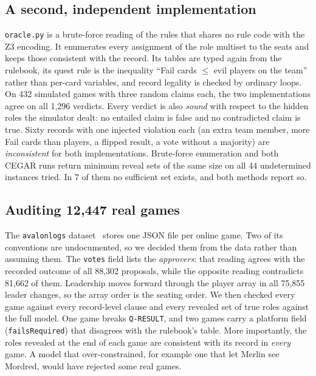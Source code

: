 \documentclass[runningheads]{llncs}
\newcommand{\cl}[1]{\texttt{#1}}
\newcommand{\vd}[1]{\emph{#1}}             %
\begin{document}
\subsection{A second, independent implementation}
\texttt{oracle.py} is a brute-force reading of the rules that shares no rule code with the Z3 encoding. It enumerates
every assignment of the role multiset to the seats and keeps those consistent with the record. Its tables are typed
again from the rulebook, its quest rule is the inequality ``Fail cards $\le$ evil players on the team'' rather than
per-card variables, and record legality is checked by ordinary loops. On 432 simulated games with three random claims
each, the two implementations agree on all 1,296 verdicts. Every verdict is also \emph{sound} with respect to the
hidden roles the simulator dealt: no entailed claim is false and no contradicted claim is true. Sixty records with one
injected violation each (an extra team member, more Fail cards than players, a flipped result, a vote without a
majority) are \vd{inconsistent} for both implementations. Brute-force enumeration and both CEGAR runs return minimum
reveal sets of the same size on all 44 undetermined instances tried. In 7 of them no sufficient set exists, and both
methods report so.

\subsection{Auditing 12,447 real games}\label{sec:audit}
The \texttt{avalonlogs} dataset~\cite{avalonlogs} stores one JSON file per online game. Two of its conventions are
undocumented, so we decided them from the data rather than assuming them. The \texttt{votes} field lists the
\emph{approvers}: that reading agrees with the recorded outcome of all 88,302 proposals, while the opposite reading
contradicts 81,662 of them. Leadership moves forward through the player array in all 75,855 leader changes, so the
array order is the seating order. We then checked every game against every record-level clause and every revealed set
of true roles against the full model. One game breaks \cl{Q-RESULT}, and two games carry a platform field
(\texttt{failsRequired}) that disagrees with the rulebook's table. More importantly, the roles revealed at the end of
each game are consistent with its record in \emph{every} game. A model that over-constrained, for example one that
let Merlin see Mordred, would have rejected some real games.

\end{document}
